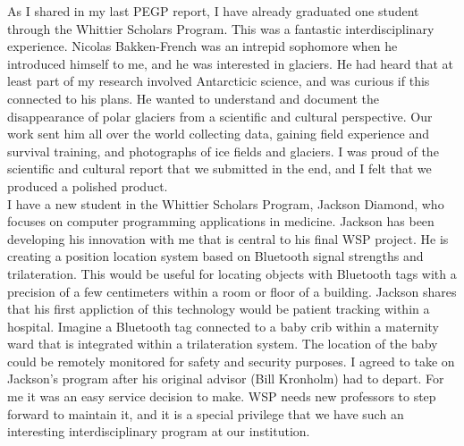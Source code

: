 \documentclass[../../../main.tex]{subfiles}
\begin{document}
As I shared in my last PEGP report, I have already graduated one student through the Whittier Scholars Program.  This was a fantastic interdisciplinary experience.  Nicolas Bakken-French was an intrepid sophomore when he introduced himself to me, and he was interested in glaciers.  He had heard that at least part of my research involved Antarcticic science, and was curious if this connected to his plans.  He wanted to understand and document the disappearance of polar glaciers from a scientific and cultural perspective.  Our work sent him all over the world collecting data, gaining field experience and survival training, and photographs of ice fields and glaciers.  I was proud of the scientific and cultural report that we submitted in the end, and I felt that we produced a polished product.
\\
\vspace{0.25cm}
I have a new student in the Whittier Scholars Program, Jackson Diamond, who focuses on computer programming applications in medicine.  Jackson has been developing his innovation with me that is central to his final WSP project.  He is creating a position location system based on Bluetooth signal strengths and trilateration.  This would be useful for locating objects with Bluetooth tags with a precision of a few centimeters within a room or floor of a building.  Jackson shares that his first appliction of this technology would be patient tracking within a hospital.  Imagine a Bluetooth tag connected to a baby crib within a maternity ward that is integrated within a trilateration system.  The location of the baby could be remotely monitored for safety and security purposes.  I agreed to take on Jackson's program after his original advisor (Bill Kronholm) had to depart.  For me it was an easy service decision to make.  WSP needs new professors to step forward to maintain it, and it is a special privilege that we have such an interesting interdisciplinary program at our institution.
\\
\vspace{0.25cm}
\end{document}
